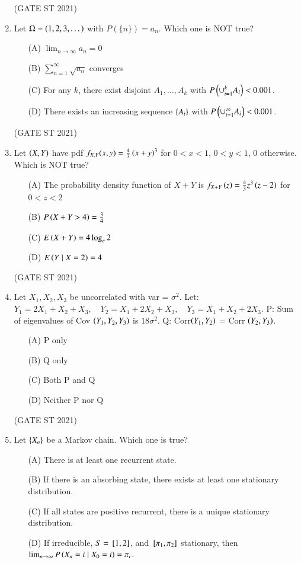 \documentclass[journal,12pt,onecolumn]{IEEEtran}
\theoremstyle{remark}
\begin{document}
\begin{enumerate}
\hfill (GATE ST 2021) \\
\item
Let $\Omega = \left(1,2,3,\dots\right)$ with $P(\{n\}) = a_n$. Which one is NOT true?
\begin{enumerate}
\item[(A)] $\lim_{n\to\infty} a_n = 0$
\item[(B)] $\sum_{n=1}^\infty \sqrt{a_n}$ converges
\item[(C)] For any $k$, there exist disjoint $A_1, \dots, A_k$ with $P\left(\cup_{i=1}^k A_i\right) < 0.001$.
\item[(D)] There exists an increasing sequence $\left\{A_i\right\}$ with $P\left(\cup_{i=1}^\infty A_i\right) < 0.001$.
\end{enumerate}

\hfill (GATE ST 2021) \\
\item
Let $\left(X,Y\right)$ have pdf $f_{X,Y}(x,y) = \frac{4}{3}\left(x+y\right)^3$ for $0 < x < 1$, $0 < y < 1$, $0$ otherwise. Which is NOT true?
\begin{enumerate}
\item[(A)] The probability density function of $X+Y$ is $f_{X+Y}\left(z\right) = \frac{4}{3} z^3 \left(z-2\right)$ for $0<z<2$
\item[(B)] $P\left(X+Y > 4\right) = \frac{3}{4}$
\item[(C)] $E\left(X+Y\right) = 4 \log_e 2$
\item[(D)] $E\left(Y \mid X=2\right) = 4$
\end{enumerate}

\hfill (GATE ST 2021) \\
\item
Let $X_1, X_2, X_3$ be uncorrelated with var = $\sigma^2$. Let:
$
Y_1 = 2X_1 + X_2 + X_3,\quad Y_2 = X_1 + 2X_2 + X_3,\quad Y_3 = X_1 + X_2 + 2X_3.
$
P: Sum of eigenvalues of Cov $\left(Y_1,Y_2,Y_3\right)$ is $18\sigma^2$.  
Q: Corr$\left(Y_1,Y_2\right)$ = Corr $\left(Y_2,Y_3\right)$.
\begin{enumerate}
\item[(A)] P only
\item[(B)] Q only
\item[(C)] Both P and Q
\item[(D)] Neither P nor Q
\end{enumerate}

\hfill (GATE ST 2021) \\


\item
Let $\left\{X_n\right\}$ be a Markov chain. Which one is true?
\begin{enumerate}
\item[(A)] There is at least one recurrent state.
\item[(B)] If there is an absorbing state, there exists at least one stationary distribution.
\item[(C)] If all states are positive recurrent, there is a unique stationary distribution.
\item[(D)] If irreducible, $S = {}\left[1,2\right]$, and ${}\left[\pi_1,\pi_2\right]$ stationary, then $\lim_{n\to\infty} P\left(X_n=i \mid X_0=i\right) = \pi_i$.
\end{enumerate}


\end{enumerate}
\end{document}
